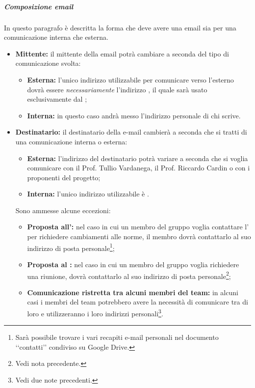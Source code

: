 \subparagraph{Composizione email}
In questo paragrafo è descritta la forma che deve avere una email sia per una comunicazione interna che esterna.
\begin{itemize}
\item \textbf{Mittente:} il mittente della email potrà cambiare a seconda del tipo di comunicazione svolta:
	\begin{itemize}
		\item \textbf{Esterna:} l'unico indirizzo utilizzabile per comunicare verso l'esterno dovrà essere \textit{necessariamente} l'indirizzo \email{}, il quale sarà usato esclusivamente dal \projectManager{};
		\item \textbf{Interna:} in questo caso andrà messo l'indirizzo personale di chi scrive.
	\end{itemize}

\item \textbf{Destinatario:} il destinatario della e-mail cambierà a seconda che si tratti di una comunicazione interna o esterna:
	\begin{itemize}
		\item \textbf{Esterna:} l'indirizzo del destinatario potrà variare a seconda che si voglia comunicare con il Prof. Tullio Vardanega, il Prof. Riccardo Cardin o con i proponenti del progetto;
		\item \textbf{Interna:} l'unico indirizzo utilizzabile è \email.
	\end{itemize}
	Sono ammesse alcune eccezioni:
	\begin{itemize}
		\item \textbf{Proposta all'\administrator{}:} nel caso in cui un membro del gruppo voglia contattare l'\administrator{} per richiedere cambiamenti alle norme, il membro dovrà contattarlo al suo indirizzo di posta personale\footnote{Sarà possibile trovare i vari recapiti e-mail personali nel documento \lq\lq{}contatti\rq\rq{} condiviso su Google Drive.};
		\item \textbf{Proposta al \projectManager{}:} nel caso in cui un membro del gruppo voglia richiedere una riunione, dovrà contattarlo al suo indirizzo di posta personale\footnote{Vedi nota precedente.};
		\item \textbf{Comunicazione ristretta tra alcuni membri del team:} in alcuni casi i membri del team potrebbero avere la necessità di comunicare tra di loro e utilizzeranno i loro indirizzi personali\footnote{Vedi due note precedenti.}.
	\end{itemize}


\end{itemize}
